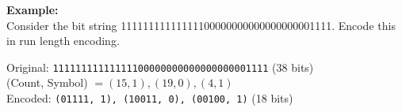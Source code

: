 \documentclass[12pt]{article}
\begin{document}
\textbf{Example:} \\
Consider the bit string 11111111111111100000000000000000001111. Encode this in run length encoding.

Original: \texttt{11111111111111100000000000000000001111} (38 bits) \\
(Count, Symbol) $= (15, 1), (19, 0), (4, 1)$ \\
Encoded: \texttt{(01111, 1), (10011, 0), (00100, 1)} (18 bits)
\end{document}
